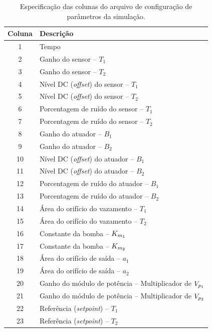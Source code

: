 \begin{table}[!htb]
\small
\centering
\caption{Especificação das colunas do arquivo de configuração de parâmetros da
         simulação.}
\label{tab:colunas_parametros}
\vspace{0.25cm}
\begin{tabular}{|c|l|}
\hline
{\bf Coluna} & {\bf Descrição}\\
\hline
\hline
1 & Tempo\\
\hline
2 & Ganho do sensor -- $T_1$\\
\hline
3 & Ganho do sensor -- $T_2$\\
\hline
4 & Nível DC ({\it offset}) do sensor -- $T_1$\\
\hline
5 & Nível DC ({\it offset}) do sensor -- $T_2$\\
\hline
6 & Porcentagem de ruído do sensor -- $T_1$\\
\hline
7 & Porcentagem de ruído do sensor -- $T_2$\\
\hline
8 & Ganho do atuador -- $B_1$\\
\hline
9 & Ganho do atuador -- $B_2$\\
\hline
10 & Nível DC ({\it offset}) do atuador -- $B_1$\\
\hline
11 & Nível DC ({\it offset}) do atuador -- $B_2$\\
\hline
12 & Porcentagem de ruído do atuador -- $B_1$\\
\hline
13 & Porcentagem de ruído do atuador -- $B_2$\\
\hline
14 & Área do orifício do vazamento -- $T_1$\\
\hline
15 & Área do orifício do vazamento -- $T_2$\\
\hline
16 & Constante da bomba -- $K_{m_{\tiny 1}}$\\
\hline
17 & Constante da bomba -- $K_{m_{\tiny 2}}$\\
\hline
18 & Área do orifício de saída -- $a_1$\\
\hline
19 & Área do orifício de saída -- $a_2$\\
\hline
20 & Ganho do módulo de potência -- Multiplicador de $V_{p_{\tiny 1}}$\\
\hline
21 & Ganho do módulo de potência -- Multiplicador de $V_{p_{\tiny 2}}$\\
\hline
22 & Referência ({\it setpoint}) -- $T_1$\\
\hline
23 & Referência ({\it setpoint}) -- $T_2$\\
\hline
\end{tabular}
\end{table}


